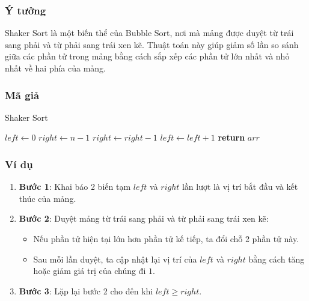 \subsubsection{Ý tưởng}

Shaker Sort là một biến thể của Bubble Sort, nơi mà mảng được duyệt từ trái sang phải và từ phải sang trái xen kẽ. Thuật toán này giúp giảm số lần so sánh giữa các phần tử trong mảng bằng cách sắp xếp các phần tử lớn nhất và nhỏ nhất về hai phía của mảng. \cite{black2009}

\subsubsection{Mã giả}

\begin{algorithm}[H]
\caption{Shaker Sort}
\begin{algorithmic}[1]
    \State $left \gets 0$
    \State $right \gets n - 1$
                \State {}
            \EndIf
        \EndFor
        \State $right \gets right - 1$
                \State {}
            \EndIf
        \EndFor
        \State $left \gets left + 1$
    \EndWhile
    \State \textbf{return} $arr$
\EndFunction
\end{algorithmic}
\end{algorithm}

\subsubsection{Ví dụ}

\begin{enumerate}
    \item \textbf{Bước 1}: Khai báo 2 biến tạm $left$ và $right$ lần lượt là vị trí bắt đầu và kết thúc của mảng.
    \item \textbf{Bước 2}: Duyệt mảng từ trái sang phải và từ phải sang trái xen kẽ:
        \begin{itemize}
            \item Nếu phần tử hiện tại lớn hơn phần tử kế tiếp, ta đổi chỗ 2 phần tử này.
            \item Sau mỗi lần duyệt, ta cập nhật lại vị trí của $left$ và $right$ bằng cách tăng hoặc giảm giá trị của chúng đi $1$.
        \end{itemize}
    \item \textbf{Bước 3}: Lặp lại bước 2 cho đến khi $left \geq right$.
\end{enumerate}

